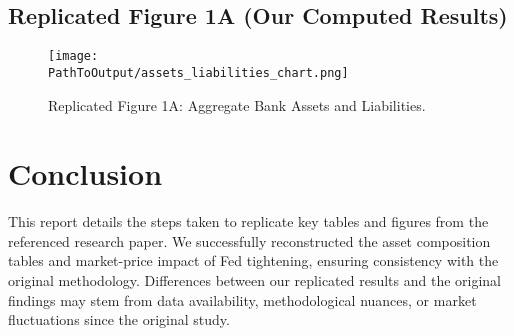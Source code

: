 \documentclass{article}
\begin{document}
\subsection{Replicated Figure 1A (Our Computed Results)}
\begin{figure}[H]
    \centering
    \texttt{[image: \\PathToOutput/assets\_liabilities\_chart.png]}
    \caption{Replicated Figure 1A: Aggregate Bank Assets and Liabilities.}
\end{figure}

\section{Conclusion}
This report details the steps taken to replicate key tables and figures from the referenced research paper. We successfully reconstructed the asset composition tables and market-price impact of Fed tightening, ensuring consistency with the original methodology. Differences between our replicated results and the original findings may stem from data availability, methodological nuances, or market fluctuations since the original study.
\end{document}
